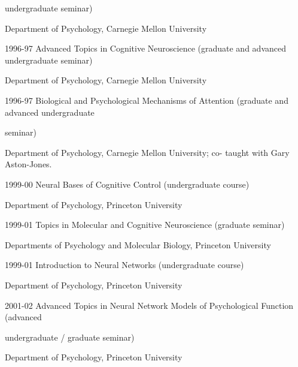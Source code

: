\documentclass[10 pt]{article}
\begin{document}
\hspace{0.81in} undergraduate seminar)

\hspace{0.81in} Department of Psychology, Carnegie Mellon University
    \smallskip

1996-97 \hspace{0.3in} Advanced Topics in Cognitive Neuroscience (graduate and advanced undergraduate seminar)

\hspace{0.81in} Department of Psychology, Carnegie Mellon University
    \smallskip

1996-97 \hspace{0.3in} Biological and Psychological Mechanisms of Attention (graduate and advanced undergraduate

\hspace{0.81in} seminar)

\hspace{0.81in} Department of Psychology, Carnegie Mellon University; co-
taught with Gary Aston-Jones.
    \smallskip

1999-00 \hspace{0.3in} Neural Bases of Cognitive Control (undergraduate course)

\hspace{0.81in} Department of Psychology, Princeton University
    \smallskip

1999-01 \hspace{0.3in} Topics in Molecular and Cognitive Neuroscience (graduate seminar)

\hspace{0.81in} Departments of Psychology and Molecular Biology, Princeton University
    \smallskip

1999-01 \hspace{0.3in} Introduction to Neural Networks (undergraduate course)

\hspace{0.81in} Department of Psychology, Princeton University
    \smallskip

2001-02 \hspace{0.3in} Advanced Topics in Neural Network Models of Psychological Function (advanced

\hspace{0.81in} undergraduate / graduate seminar)

\hspace{0.81in} Department of Psychology, Princeton University
    \smallskip
\end{document}
